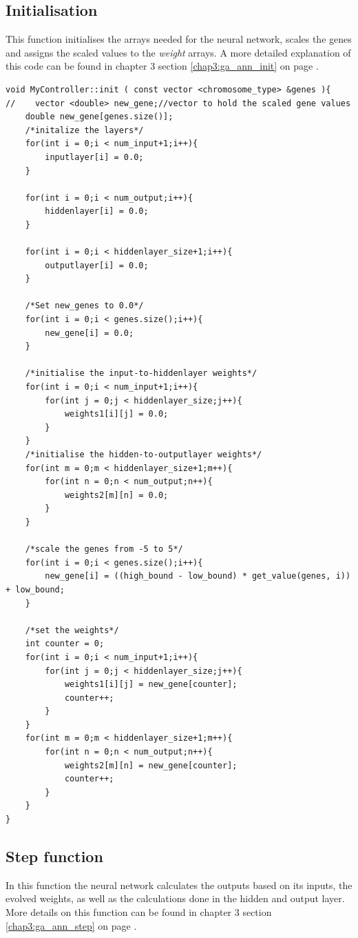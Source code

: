 \subsection{Initialisation}
\label{code:ga_ann_init}
This function initialises the arrays needed for the neural network,  scales the genes and assigns the scaled values to the \textit{weight} arrays. A more detailed explanation of this code can be found in chapter 3 section \ref{chap3:ga_ann_init} on page \pageref{chap3:ga_ann_init}.
\begin{lstlisting}[caption = {GA assisted Artificial Neural Network initialisation}]
void MyController::init ( const vector <chromosome_type> &genes ){
//    vector <double> new_gene;//vector to hold the scaled gene values
    double new_gene[genes.size()];
    /*initalize the layers*/
    for(int i = 0;i < num_input+1;i++){
        inputlayer[i] = 0.0;
    }

    for(int i = 0;i < num_output;i++){
        hiddenlayer[i] = 0.0;
    }

    for(int i = 0;i < hiddenlayer_size+1;i++){
        outputlayer[i] = 0.0;
    }

    /*Set new_genes to 0.0*/
    for(int i = 0;i < genes.size();i++){
        new_gene[i] = 0.0;
    }

    /*initialise the input-to-hiddenlayer weights*/
    for(int i = 0;i < num_input+1;i++){
        for(int j = 0;j < hiddenlayer_size;j++){
            weights1[i][j] = 0.0;
        }
    }
    /*initialise the hidden-to-outputlayer weights*/
    for(int m = 0;m < hiddenlayer_size+1;m++){
        for(int n = 0;n < num_output;n++){
            weights2[m][n] = 0.0;
        }
    }

    /*scale the genes from -5 to 5*/
    for(int i = 0;i < genes.size();i++){
        new_gene[i] = ((high_bound - low_bound) * get_value(genes, i)) + low_bound;
    }

    /*set the weights*/
    int counter = 0;
    for(int i = 0;i < num_input+1;i++){
        for(int j = 0;j < hiddenlayer_size;j++){
            weights1[i][j] = new_gene[counter];
            counter++;
        }
    }
    for(int m = 0;m < hiddenlayer_size+1;m++){
        for(int n = 0;n < num_output;n++){
            weights2[m][n] = new_gene[counter];
            counter++;
        }
    }
}
\end{lstlisting}

\subsection{Step function}
\label{code:ga_ann_step}
In this function the neural network calculates the outputs based on its inputs, the evolved weights, as well as the calculations done in the hidden and output layer.\\
More details on this function can be found in chapter 3 section \ref{chap3:ga_ann_step} on page \pageref{chap3:ga_ann_step}.


